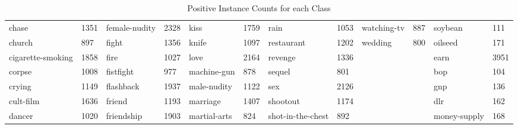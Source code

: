 \begin{landscape}
\begin{table}[]
\begin{tabular}{llllllllllll}
		chase                             & 1351      & female-nudity                & 2328      & kiss                       & 1759      & rain                         & 1053      & watching-tv               & 887       & soybean      & 111       \\
		church                            & 897       & fight                        & 1356      & knife                      & 1097      & restaurant                   & 1202      & wedding                   & 800       & oilseed      & 171       \\
		cigarette-smoking                 & 1858      & fire                         & 1027      & love                       & 2164      & revenge                      & 1336      &                           &           & earn         & 3951      \\
		corpse                            & 1008      & fistfight                    & 977       & machine-gun                & 878       & sequel                       & 801       &                           &           & bop          & 104       \\
		crying                            & 1149      & flashback                    & 1937      & male-nudity                & 1122      & sex                          & 2126      &                           &           & gnp          & 136       \\
		cult-film                         & 1636      & friend                       & 1193      & marriage                   & 1407      & shootout                     & 1174      &                           &           & dlr          & 162       \\
		dancer                            & 1020      & friendship                   & 1903      & martial-arts               & 824       & shot-in-the-chest            & 892       &                           &           & money-supply & 168      
	\end{tabular}
\caption{Positive Instance Counts for each Class}
\end{table}
\end{landscape}